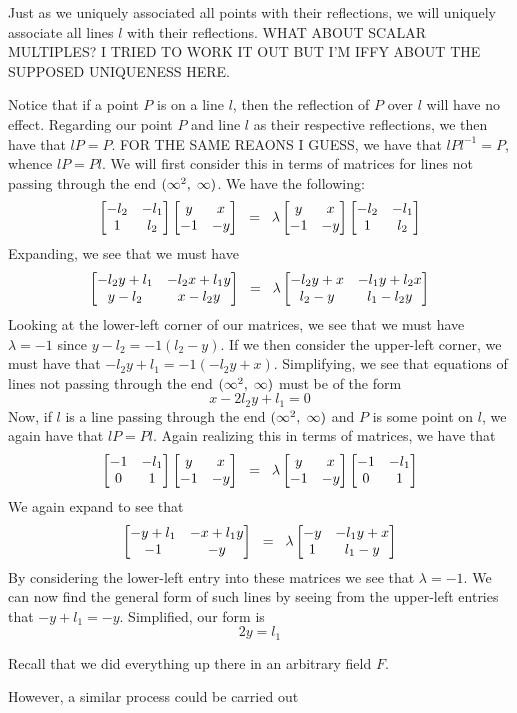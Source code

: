 \documentclass[12pt]{article}
\newcommand{\inv}{^{-1}}
\newcommand{\spceq}{\hspace{2mm} = \hspace{2mm}}
\newcommand{\ttc}{, \hspace{1mm}}
\newcommand{\lftmat}[4]{\begin{bmatrix} {#1} & {#2} \\ {#3} & {#4} \end{bmatrix}}
\newcommand{\pointmat}[2]{\lftmat{{#2}}{{#1}}{-1}{-{#2}}}
\newcommand{\stanpointmat}{\pointmat{x}{y}}
\newcommand{\linenoendmat}[2]{\begin{bmatrix} -{#2} & -{#1} \\ 1 & {#2} \end{bmatrix}}
\newcommand{\stanlinenoendmat}{\linenoendmat{l_1}{l_2}}
\newcommand{\lineendmat}[2]{\begin{bmatrix} -1 & -{#1} \\ 0 & 1 \end{bmatrix}}
\newcommand{\stanlineendmat}{\lineendmat{l_1}{l_2}}
\newcommand{\specialend}{(\infty^2\ttc\infty)}
\begin{document}
Just as we uniquely associated all points with their reflections, we will uniquely associate all lines $l$ with their reflections. WHAT ABOUT SCALAR MULTIPLES? I TRIED TO WORK IT OUT BUT I'M IFFY ABOUT THE SUPPOSED UNIQUENESS HERE. 

Notice that if a point $P$ is on a line $l$, then the reflection of $P$ over $l$ will have no effect. Regarding our point $P$ and line $l$ as their respective reflections, we then have that $lP = P$. FOR THE SAME REAONS I GUESS, we have that $lPl\inv = P$, whence $lP = Pl$. We will first consider this in terms of matrices for lines not passing through the end $\specialend$. We have the following:
\begin{equation} 
\stanlinenoendmat\stanpointmat \spceq \lambda \stanpointmat\stanlinenoendmat
\end{equation}	
Expanding, we see that we must have
\[
\lftmat{-l_2y+l_1}{-l_2x+l_1y}{y-l_2}{x-l_2y} \spceq \lambda \lftmat{-l_2y+x}{-l_1y+l_2x}{l_2-y}{l_1-l_2y}
\]
Looking at the lower-left corner of our matrices, we see that we must have $\lambda = -1$ since $y - l_2 = -1(l_2 - y)$. If we then consider the upper-left corner, we must have that $-l_2y + l_1 = -1(-l_2y + x)$. Simplifying, we see that equations of lines not passing through the end $\specialend$ must be of the form
\begin{equation}
x - 2l_2y + l_1  = 0
\end{equation} 
Now, if $l$ is a line passing through the end $\specialend$ and $P$ is some point on $l$, we again have that $lP = Pl$. Again realizing this in terms of matrices, we have that 
\begin{equation} 
\stanlineendmat\stanpointmat \spceq \lambda \stanpointmat\stanlineendmat
\end{equation}	
We again expand to see that 
\[
\lftmat{-y+l_1}{-x+l_1y}{-1}{-y} \spceq \lambda \lftmat{-y}{-l_1y+x}{1}{l_1-y}
\]
By considering the lower-left entry into these matrices we see that $\lambda = -1$. We can now find the general form of such lines by seeing from the upper-left entries that $-y+l_1 = -y$. Simplified, our form is 
\begin{equation}
2y=l_1
\end{equation} 

Recall that we did everything up there in an arbitrary field $F$. 

However, a similar process could be carried out 
\end{document}
